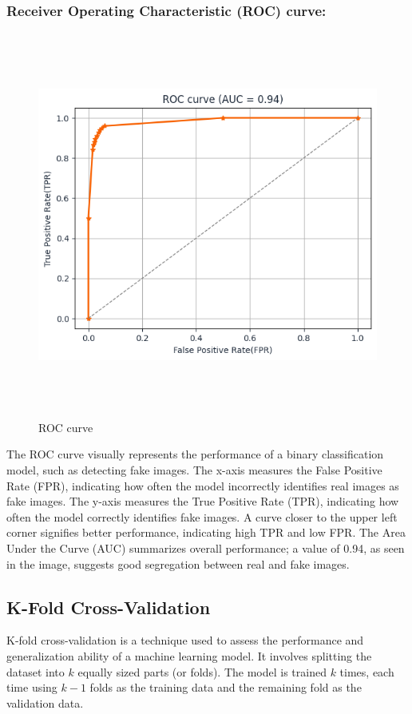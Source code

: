 \subsubsection{Receiver Operating Characteristic (ROC) curve:}
\begin{figure}[ht]
    \centering
    \includegraphics[width=5in, height =5in ]{img/ROC_AUC.png}
    \caption{{ROC curve }}
\end{figure}

The ROC curve visually represents the performance of a binary classification model, such as detecting fake images. The x-axis measures the False Positive Rate (FPR), indicating how often the model incorrectly identifies real images as fake images. The y-axis measures the True Positive Rate (TPR), indicating how often the model correctly identifies fake images. A curve closer to the upper left corner signifies better performance, indicating high TPR and low FPR. The Area Under the Curve (AUC) summarizes overall performance; a value of 0.94, as seen in the image, suggests good segregation  between real and fake images.
\newpage
\subsection{K-Fold Cross-Validation}

K-fold cross-validation is a technique used to assess the performance and generalization ability of a machine learning model. It involves splitting the dataset into \(k\) equally sized parts (or folds). The model is trained \(k\) times, each time using \(k-1\) folds as the training data and the remaining fold as the validation data.\\


